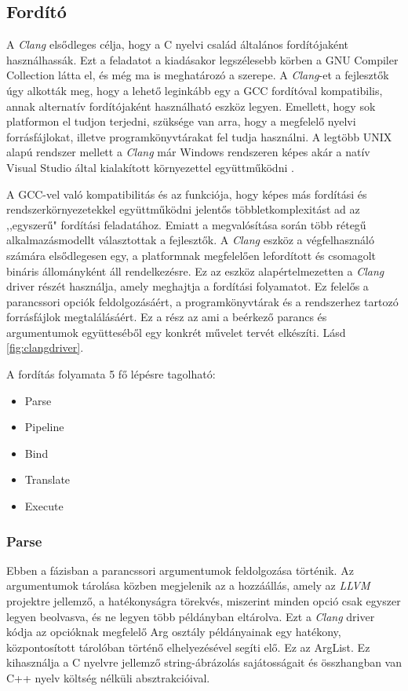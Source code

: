 \documentclass[a4paper,12pt]{report}
\begin{document}
\subsection*{Fordító}
A \emph{Clang} elsődleges célja, hogy a C nyelvi család általános fordítójaként használhassák. Ezt a feladatot a kiadásakor legszélesebb körben a GNU Compiler Collection látta el, és még ma is meghatározó a szerepe. A \emph{Clang}-et a fejlesztők úgy alkották meg, hogy a lehető leginkább egy a GCC fordítóval kompatibilis, annak alternatív fordítójaként használható eszköz legyen. Emellett, hogy sok platformon el tudjon terjedni, szüksége van arra, hogy a megfelelő nyelvi forrásfájlokat, illetve programkönyvtárakat fel tudja használni. A legtöbb UNIX alapú rendszer mellett a \emph{Clang} már Windows rendszeren képes akár a natív Visual Studio által kialakított környezettel együttműködni \cite{clangusermanual}.

A GCC-vel való kompatibilitás és az funkciója, hogy képes más fordítási és rendszerkörnyezetekkel együttműködni jelentős többletkomplexitást ad az ,,egyszerű" fordítási feladatához. Emiatt a megvalósítása során több rétegű alkalmazásmodellt választottak a fejlesztők. A \emph{Clang} eszköz a végfelhasználó számára elsődlegesen egy, a platformnak megfelelően lefordított és csomagolt bináris állományként áll rendelkezésre. Ez az eszköz alapértelmezetten a \emph{Clang} driver részét használja, amely meghajtja a fordítási folyamatot. Ez felelős a parancssori opciók feldolgozásáért, a programkönyvtárak és a rendszerhez tartozó forrásfájlok megtalálásáért. Ez a rész az ami a beérkező parancs és argumentumok együtteséből egy konkrét művelet tervét elkészíti. Lásd \ref{fig:clangdriver}.

A fordítás folyamata 5 fő lépésre tagolható:
\begin{itemize}
\item Parse
\item Pipeline
\item Bind
\item Translate
\item Execute
\end{itemize}

\subsubsection{Parse}
Ebben a fázisban a parancssori argumentumok feldolgozása történik. Az argumentumok tárolása közben megjelenik az a hozzáállás, amely az \emph{LLVM} projektre jellemző, a hatékonyságra törekvés, miszerint minden opció csak egyszer legyen beolvasva, és ne legyen több példányban eltárolva. Ezt a \emph{Clang} driver kódja az opcióknak megfelelő Arg osztály példányainak egy hatékony, központosított tárolóban történő elhelyezésével segíti elő. Ez az ArgList. Ez kihasználja a C nyelvre jellemző string-ábrázolás sajátosságait és  összhangban van C++ nyelv költség nélküli absztrakcióival.
\end{document}
